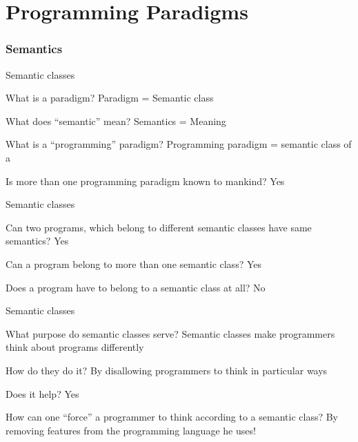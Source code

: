 \part[Programming Paradigms]{Programming Paradigms}
\section{Semantics}
\begin{frame}{Semantic classes}
\begin{block}{What is a paradigm?}
\pause
Paradigm = Semantic class
\end{block}
\pause
\begin{block}{What does ``semantic'' mean?}
\pause
Semantics = Meaning
\end{block}
\pause
\begin{block}{What is a ``programming'' paradigm?}
\pause
Programming paradigm = semantic class of a 
\end{block}
\pause
\begin{block}{Is more than one programming paradigm known to mankind?}
\pause
Yes
\end{block}
\end{frame}

\begin{frame}{Semantic classes}
\begin{block}{Can two programs, which belong to different semantic classes have
same semantics?}
\pause
Yes
\end{block}
\pause
\begin{block}{Can a program belong to more than one semantic class?}
\pause
Yes
\end{block}
\pause
\begin{block}{Does a program have to belong to a semantic class at all?}
\pause
No
\end{block}
\end{frame}

\begin{frame}{Semantic classes}
\begin{block}{What purpose do semantic classes serve?}
\pause
Semantic classes make programmers think about programs differently
\end{block}
\pause
\begin{block}{How do they do it?}
\pause
By disallowing programmers to think in particular ways
\end{block}
\pause
\begin{block}{Does it help?}
\pause
Yes
\end{block}
\pause
\begin{block}{
How can one ``force'' a programmer to think according to a semantic class?}
\pause
By \alert{removing} features from the programming language he uses!
\end{block}
\end{frame}

